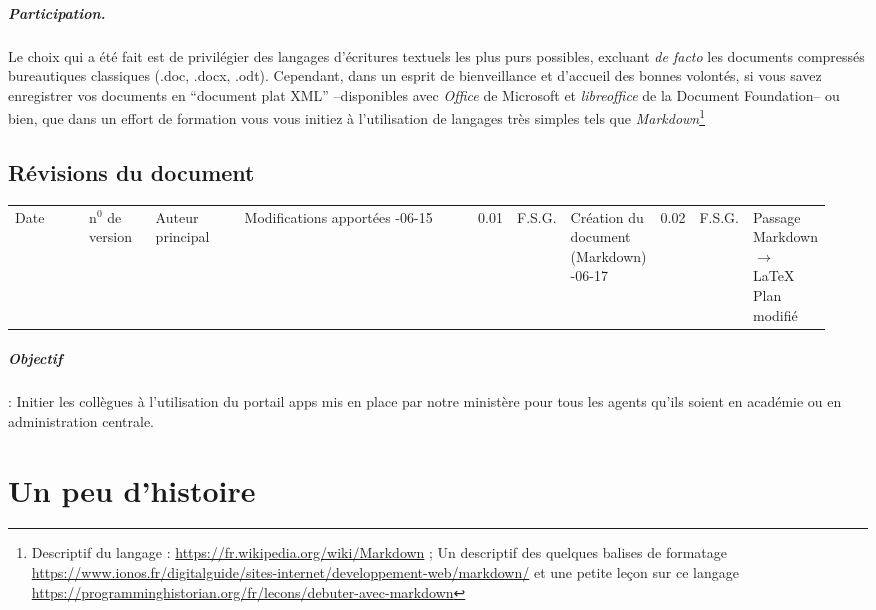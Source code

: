\documentclass[a4paper, 11pt]{book}
\begin{document}
\paragraph*{Participation.}
Le choix qui a été fait est de privilégier des langages d'écritures textuels les plus purs possibles, excluant \emph{de facto\/} les documents compressés bureautiques classiques (.doc, .docx, .odt). 
Cependant, dans un esprit de bienveillance et d'accueil des bonnes volontés, si vous savez enregistrer vos documents en ``document plat XML'' --disponibles avec \emph{Office} de Microsoft et \emph{libreoffice} de la Document Foundation-- ou bien, que dans un effort de formation vous vous initiez à l'utilisation de langages très simples tels que \emph{Markdown}\footnote{%
Descriptif du langage : \url{https://fr.wikipedia.org/wiki/Markdown} ; Un descriptif des quelques balises de formatage \url{https://www.ionos.fr/digitalguide/sites-internet/developpement-web/markdown/} et une petite leçon sur ce langage \url{https://programminghistorian.org/fr/lecons/debuter-avec-markdown}
}


\section*{Révisions du document}
\begin{table}
	\centering
	\renewcommand{\arraystretch}{1.25}
	\begin{tabular}{| m{0.15\linewidth} | m{0.1\linewidth} | m{0.15\linewidth} | m{0.55\linewidth} |}
		\hline
		Date & n$^0$ de version & Auteur principal & Modifications apportées \cr
		-06-15 & 0.01 & F.S.G. & Création du document (Markdown) \cr
		-06-17 & 0.02 & F.S.G. & Passage Markdown $\rightarrow$ \LaTeX{} \newline Plan modifié \cr
		\hline
	\end{tabular}
\end{table}


\paragraph{Objectif} : Initier les collègues à l'utilisation du portail apps mis en place par notre ministère pour tous les agents qu'ils soient en académie ou en administration centrale. 

\chapter*{Un peu d'histoire}
\end{document}
